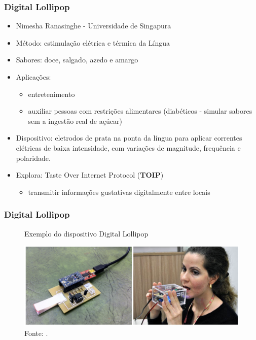 \documentclass{beamer}
\begin{document}
\begin{frame}
  \frametitle{Digital Lollipop}
  \begin{itemize}
    \item Nimesha Ranasinghe - Universidade de Singapura
    \item Método: estimulação elétrica  e térmica da Língua
    \item Sabores: doce, salgado, azedo e amargo
    \item Aplicações:
    \begin{itemize}
      \item entretenimento
      \item auxiliar pessoas com restrições alimentares (diabéticos - simular sabores sem a ingestão real de açúcar)
    \end{itemize}
    \item Dispositivo: eletrodos de prata na ponta da língua para aplicar correntes elétricas de baixa intensidade, com variações de magnitude, frequência e polaridade.  
    \item Explora: Taste Over Internet Protocol (\textbf{TOIP})
    \begin{itemize}
      \item transmitir informações gustativas digitalmente entre locais
    \end{itemize}
  \end{itemize}
  \cite{ranasingheTongueMountedInterface2012}
  \cite{ranasingheVirtualTasteDigital2023}
\end{frame}

\begin{frame}
  \frametitle{Digital Lollipop}
  \begin{figure}[h]
    \centering
    \caption{Exemplo do dispositivo Digital Lollipop}
    \vspace{-18pt}
    \includegraphics[width=1.03\textwidth]{img_DigitalLollipop.png}
    \vspace{-20pt}
    \caption*{Fonte: \cite{ranasingheDigitalLollipopStudying2016}.}
  \end{figure}
\end{frame}
\end{document}

